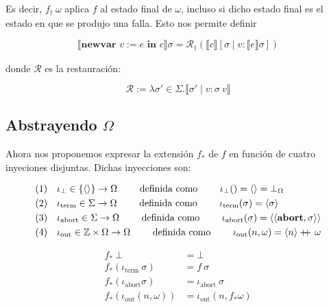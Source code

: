 \documentclass[a4paper, 12pt]{article}
\newcommand\doubleplus{+\kern-1.3ex+\kern0.8ex}
\begin{document}
Es decir, $f_\dagger ~ \omega$ aplica $f$ al estado final de $\omega$, incluso
si dicho estado final es el estado en que se produjo una falla. Esto nos permite
definir 

\begin{equation*}
  \llbracket \textbf{newvar } v := e \textbf{ in } c\rrbracket\sigma = \mathcal{R}_\dagger \left( \llbracket c \rrbracket[\sigma \mid v :
  \llbracket e \rrbracket \sigma] \right) 
\end{equation*}

donde $\mathcal{R}$ es la restauración:

\begin{equation*}
  \mathcal{R} := \lambda \sigma' \in \Sigma . \llbracket \sigma' \mid v : \sigma
  ~ v\rrbracket
\end{equation*}

\subsection{Abstrayendo $\Omega$}

Ahora nos proponemos expresar la extensión $f_*$ de $f$ en función de cuatro
inyeciones disjuntas. Dichas inyecciones son:

\begin{align*}
  &(1) ~ ~ ~ \iota_\bot \in \left\{ \left< \right> \right\} \to \Omega \qquad \text{ definida como
  } \qquad \iota_\bot () = \left< \right> = \bot_\Omega\\
  &(2) ~ ~  ~\iota_{\text{term}} \in \Sigma \to \Omega \qquad \text{ definida como
  } \qquad \iota_{\text{term}}(\sigma) = \left<\sigma \right>\\
  &(3) ~ ~ ~ \iota_{\text{abort}} \in \Sigma \to \Omega \qquad \text{ definida como
  } \qquad \iota_{\text{abort}} (\sigma) = \left<\left<\textbf{abort}, \sigma \right> \right>\\
  &(4)~ ~ ~ \iota_{\text{out}} \in \mathbb{Z} \times \Omega \to \Omega \qquad \text{ definida como
  } \qquad \iota_{\text{out}}(n, \omega) = \left<n \right> \doubleplus \omega
\end{align*}

\begin{align*}
  f_* ~ \bot &= \bot  \\ 
  f_*(\iota_\text{term} ~ \sigma) &= f ~ \sigma \\ 
  f_*(\iota_{\text{abort}} \sigma) &= \iota_{\text{abort}} ~ \sigma \\ 
  f_*(\iota_{\text{out}}(n, \omega)) &= \iota_{\text{out}}(n, f_* \omega)
\end{align*}
\end{document}
